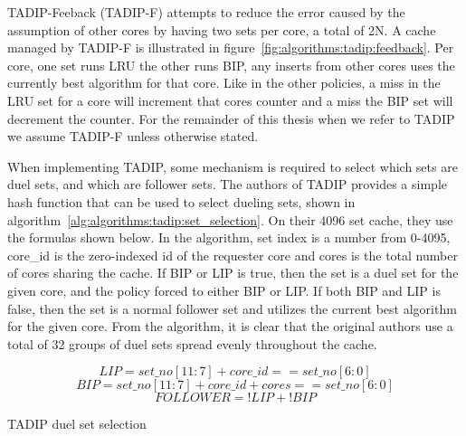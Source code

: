 TADIP-Feeback (TADIP-F) attempts to reduce the error caused by the assumption of other cores by having two sets per core, a total of 2N.
A cache managed by TADIP-F is illustrated in figure~\ref{fig:algorithms:tadip:feedback}.
Per core, one set runs LRU the other runs BIP, any inserts from other cores uses the currently best algorithm for that core.
Like in the other policies, a miss in the LRU set for a core will increment that cores counter and a miss the BIP set will decrement the counter.
For the remainder of this thesis when we refer to TADIP we assume TADIP-F unless otherwise stated.

When implementing TADIP, some mechanism is required to select which sets are duel sets, and which are follower sets.
The authors of TADIP provides a simple hash function that can be used to select dueling sets, shown in algorithm~\ref{alg:algorithms:tadip:set_selection}.
On their 4096 set cache, they use the formulas shown below.
In the algorithm, set index is a number from 0-4095, core\_id is the zero-indexed id of the requester core and cores is the total number of cores sharing the cache.
If BIP or LIP is true, then the set is a duel set for the given core, and the policy forced to either BIP or LIP.
If both BIP and LIP is false, then the set is a normal follower set and utilizes the current best algorithm for the given core.
From the algorithm, it is clear that the original authors use a total of 32 groups of duel sets spread evenly throughout the cache.
\begin{algorithm}[ht]
\begin{equation}
LIP = set\_no[11:7] + core\_id == set\_no[6:0]
\end{equation}
\begin{equation}
BIP = set\_no[11:7] + core\_id + cores == set\_no[6:0]
\end{equation}
\begin{equation}
FOLLOWER = !LIP + !BIP
\end{equation}
\caption{TADIP duel set selection}
\label{alg:algorithms:tadip:set_selection}
\end{algorithm}
